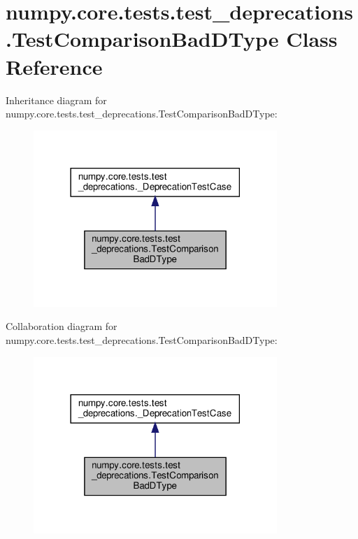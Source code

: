 \hypertarget{classnumpy_1_1core_1_1tests_1_1test__deprecations_1_1TestComparisonBadDType}{}\section{numpy.\+core.\+tests.\+test\+\_\+deprecations.\+Test\+Comparison\+Bad\+D\+Type Class Reference}
\label{classnumpy_1_1core_1_1tests_1_1test__deprecations_1_1TestComparisonBadDType}


Inheritance diagram for numpy.\+core.\+tests.\+test\+\_\+deprecations.\+Test\+Comparison\+Bad\+D\+Type\+:
\nopagebreak
\begin{figure}[H]
\begin{center}
\leavevmode
\includegraphics[width=261pt]{classnumpy_1_1core_1_1tests_1_1test__deprecations_1_1TestComparisonBadDType__inherit__graph}
\end{center}
\end{figure}


Collaboration diagram for numpy.\+core.\+tests.\+test\+\_\+deprecations.\+Test\+Comparison\+Bad\+D\+Type\+:
\nopagebreak
\begin{figure}[H]
\begin{center}
\leavevmode
\includegraphics[width=261pt]{classnumpy_1_1core_1_1tests_1_1test__deprecations_1_1TestComparisonBadDType__coll__graph}
\end{center}
\end{figure}
